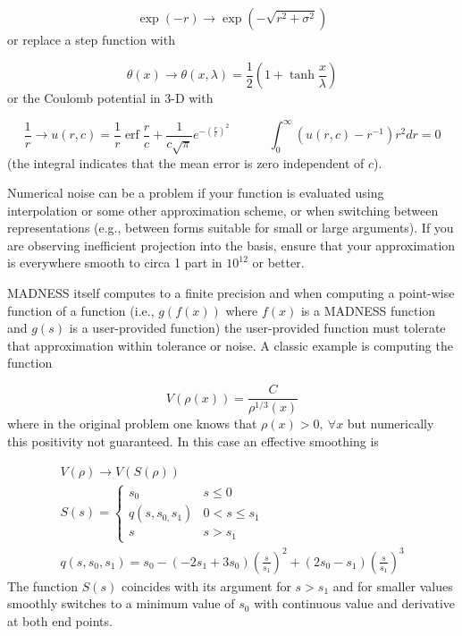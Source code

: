 \documentclass[letterpaper]{article}
\begin{document}
\begin{equation}
\exp (-r)\to \exp (-\sqrt{r^{2}+\sigma ^{2}})
\end{equation}
or replace a step function with 

\begin{equation}
\theta (x)\to \theta (x,\lambda )=\frac{1}{2}(1+\tanh \frac{x}{\lambda })
\end{equation}
or the Coulomb potential in 3-D with 

\begin{equation}
\frac{1}{r}\to u(r,c)=\frac{1}{r}\operatorname{erf}\frac{r}{c}+\frac{1}{c\sqrt{\pi
}}e^{-\left(\frac{r}{c}\right)^{2}}\ \ \ \ \ \ \ \ \ \ \ \ \ \ \int _{0}^{\infty
}\left(u(r,c)-r^{-1}\right)r^{2}\mathit{dr}=0
\end{equation}
(the integral indicates that the mean error is zero independent of  $c$).

Numerical noise can be a problem if your function is evaluated using interpolation or some other approximation scheme,
or when switching between representations (e.g., between forms suitable for small or large arguments). If you are
observing inefficient projection into the basis, ensure that your approximation is everywhere smooth to circa 1 part in
 $10^{12}$ or better.

MADNESS itself computes to a finite precision and when computing a point-wise function of a function (i.e.,  $g(f(x))$
where  $f(x)$ is a MADNESS function and  $g(s)$ is a user-provided function) the user-provided function must tolerate
that approximation within tolerance or noise. A classic example is computing the function

\begin{equation}
V(\rho (x))=\frac{C}{\rho ^{1/3}(x)}
\end{equation}
where in the original problem one knows that  $\rho (x)>0,\ \forall x$ but numerically this positivity not guaranteed.
In this case an effective smoothing is 

\begin{equation}
\begin{gathered}V(\rho )\to V(S(\rho ))\\S(s)=\left\{\begin{matrix}s_{0}&s\le 0\\q(s,s_{0,}s_{1})&0<s\le
s_{1}\\s&s>s_{1}\end{matrix}\right.\\q(s,s_{0},s_{1})=s_{0}-(-2s_{1}+3s_{0})\left(\frac{s}{s_{1}}\right)^{2}+(2s_{0}-s_{1})\left(\frac{s}{s_{1}}\right)^{3}\end{gathered}
\end{equation}
The function  $S(s)$ coincides with its argument for  $s>s_{1}$ and for smaller values smoothly switches to a minimum
value of  $s_{0}$ with continuous value and derivative at both end points.
\end{document}

